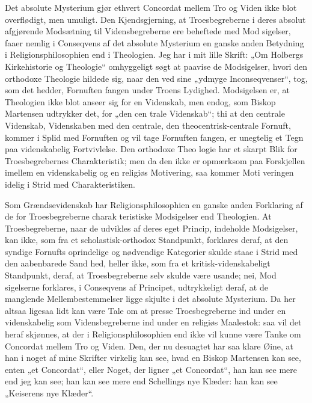 \documentclass[12pt]{book}
\newcommand{\opage}[1]{\marginnote{\footnotesize\textit{[#1]}}}
\begin{document}
Det absolute Mysterium gjør ethvert Concordat mellem
Tro og Viden ikke blot overflødigt, men umuligt. Den
Kjendsgjerning, at Troesbegreberne i deres absolut afgjørende
Modsætning til Vidensbegreberne ere beheftede med Mod\-%
sigelser, faaer nemlig i Conseqvens af det absolute Mysterium
en ganske anden Betydning i Religionsphilosophien end i
Theologien. Jeg har i mit lille Skrift: „Om Holbergs
Kirkehistorie og Theologie“ omhyggeligt søgt at paavise de
Modsigelser, hvori den orthodoxe Theologie hildede sig, naar
den ved sine „ydmyge Inconseqvenser“, tog, som det hedder,
Fornuften fangen under Troens Lydighed. Modsigelsen er,
at Theologien ikke blot anseer sig for en Videnskab, men
endog, som Biskop Martensen udtrykker det, for „den cen\-%
trale Videnskab“; thi at den centrale Videnskab, Videnskaben
med den centrale, den theocentrisk-centrale Fornuft, kommer i
Splid med Fornuften og vil tage Fornuften fangen, er unegtelig
et Tegn paa videnskabelig Fortvivlelse. Den orthodoxe Theo\-%
logie har et skarpt Blik for Troesbegrebernes Charakteristik;
men da den ikke er opmærksom paa Forskjellen imellem en
videnskabelig og en religiøs Motivering, saa kommer Moti\-%
veringen idelig i Strid med Charakteristiken.

Som Grændsevidenskab har Religionsphilosophien en
ganske anden Forklaring af de for Troesbegreberne charak\-%
teristiske Modsigelser end Theologien. At Troesbegreberne,
naar de udvikles af deres eget Princip, indeholde Modsigelser,
kan ikke, som fra et scholastisk-orthodox Standpunkt, forklares
deraf, at den syndige Fornufts oprindelige og nødvendige
Kategorier skulde staae i Strid med den aabenbarede Sand\-%
hed, heller ikke, som fra et kritisk-videnskabeligt Standpunkt,
\opage{140}\setcounter{footnote}{0}%
deraf, at Troesbegreberne selv skulde være usande; nei, Mod\-%
sigelserne forklares, i Conseqvens af Principet, udtrykkeligt
deraf, at de manglende Mellembestemmelser ligge skjulte i det
absolute Mysterium. Da her altsaa ligesaa lidt kan være
Tale om at presse Troesbegreberne ind under en videnskabelig
som Vidensbegreberne ind under en religiøs Maalestok: saa
vil det heraf skjønnes, at der i Religionsphilosophien end ikke
vil kunne være Tanke om Concordat mellem Tro og Viden.
Den, der nu desuagtet har saa klare Øine, at han i noget af mine
Skrifter virkelig kan see, hvad en Biskop Martensen kan see,
enten „et Concordat“, eller Noget, der ligner „et Concordat“,
han kan see mere end jeg kan see; han kan see mere end
Schellings nye Klæder: han kan see „Keiserens nye Klæder“.
\end{document}
